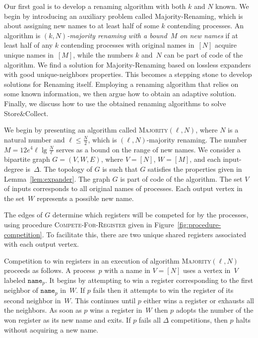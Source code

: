 \documentclass[11pt]{article}
\begin{document}
Our first goal is to develop a renaming algorithm with both $k$ and $N$ known.
We begin by introducing an auxiliary problem called Majority-Renaming, which is about assigning new names to at least half of some $k$ contending processes.
An algorithm is \emph{$(k,N)$-majority renaming with a bound~$M$ on new names} if at least half of any $k$ contending processes with original names in~$[N]$ acquire unique names in~$[M]$, while the numbers $k$ and~$N$ can be part of code of the algorithm.
We find a solution for Majority-Renaming based on lossless expanders with good unique-neighbors properties.
This becomes a stepping stone to develop solutions for Renaming itself.
Employing a renaming algorithm that relies on some known information, we then argue how to obtain an adaptive solution.
Finally, we discuss how to use the obtained renaming algorithms to solve Store\&Collect.

We begin by presenting an algorithm called \textsc{Majority}$(\ell,N)$, where $N$ is a natural number and $\ell\le \frac{N}{2}$, which is $(\ell,N)$-majority renaming.
The number $M=12e^4\ell\lg\frac{N}{\ell}$ serves as a bound on the range of new names.
We consider a bipartite graph $G=(V,W,E)$, where $V=[N]$, $W=[M]$, and each input-degree is~$\Delta$.
The topology of $G$ is such that $G$ satisfies the properties given in Lemma~\ref{lem:expander}.
The graph $G$ is part of code of the algorithm.
The set $V$ of inputs corresponds to all  original names of processes.
Each output vertex in the set~$W$ represents a possible new name. 

The edges of $G$ determine which registers will be competed for by the processes, using procedure \textsc{Compete-For-Register} given in Figure~\ref{fig:procedure-competition}.
To facilitate this, there are two unique shared registers associated with each output vertex.

Competition to win registers in an execution of algorithm \textsc{Majority}$(\ell,N)$ proceeds as follows.
A process~$p$ with a name in $V=[N]$ uses a vertex  in~$V$ labeled $\texttt{name}_p$.
It begins by attempting to win a register corresponding to the first neighbor of $\texttt{name}_p$ in~$W$.
If $p$ fails then it attempts to win the register of its second neighbor in~$W$.
This continues until $p$ either wins a register or exhausts all the neighbors. 
As soon as $p$ wins a register in~$W$ then $p$ adopts the number of the won register as its new name and exits.
If $p$ fails all $\Delta$ competitions, then $p$ halts without acquiring a new name.
\end{document}
